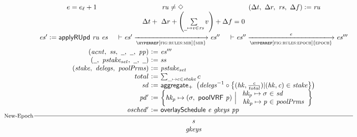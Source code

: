 \begin{figure}[ht]
  \begin{equation}\label{eq:new-epoch}
    \inference[New-Epoch]
    {
      e = e_\ell + 1
      &
      \var{ru} \neq \Nothing
      &
      (\Delta t,~\Delta r,~\var{rs},~\Delta f)\leteq\var{ru}
      \\
      \Delta t+~\Delta r+\left(\sum\limits_{\wcard\mapsto v\in\var{rs}} v\right)+\Delta f=0
      \\
      \var{es'}\leteq\fun{applyRUpd}~\var{ru}~\var{es}
      &
      {
        \vdash
        \var{es'}
          \trans{\hyperref[fig:rules:mir]{mir}}{}\var{es''}
      }
      &
      {
        \vdash
        \var{es''}
          \trans{\hyperref[fig:rules:epoch]{epoch}}{\var{e}}\var{es'''}
      }
      \\~\\
      {\begin{array}{r@{~\leteq~}l}
          (\var{acnt},~\var{ss},~\wcard,~\wcard,~\var{pp}) & \var{es'''} \\
         (\wcard,~\var{pstake_{set}},~\wcard,~\wcard) & \var{ss} \\
         (\var{stake},~\var{delegs},~\var{poolPrms}) & \var{pstake_{set}} \\
         total & \sum_{\_ \mapsto c\in\var{stake}} c \\
          \var{sd} & \fun{aggregate_{+}}~\left(\var{delegs}^{-1}\circ
                     \left\{
                     (\var{hk}, \frac{\var{c}}{\var{total}}) \vert (\var{hk},
                     \var{c}) \in \var{stake}
                 \right\}\right) \\
          \var{pd'} &
            \left\{\var{hk_p}\mapsto(\sigma,~\fun{poolVRF}~\var{p})
            ~\Big\vert~
            {
              \begin{array}{r@{~\in~}l}
                \var{hk_p}\mapsto\sigma & \var{sd} \\
                \var{hk_p}\mapsto\var{p} & \var{poolPrms}
              \end{array}
            }
            \right\}\\
          \var{osched'} & \overlaySchedule{e}{gkeys}{pp} \\
       \end{array}}
    }
    {
      {\begin{array}{c}
         \var{s} \\
         \var{gkeys} \\
       \end{array}}
}
\end{equation}
\end{figure}
